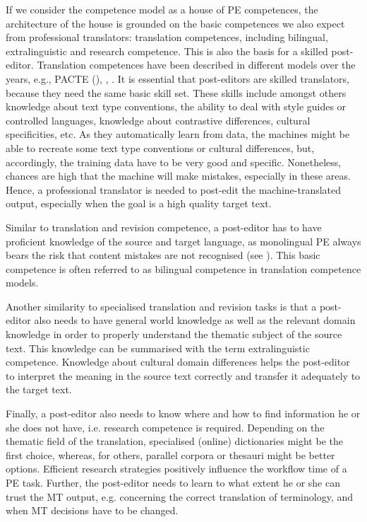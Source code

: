 If we consider the competence model as a house of PE competences, the architecture of the house is grounded on the basic competences we also expect from professional translators: translation competences, including bilingual, extralinguistic and research competence. This is also the basis for a skilled post-editor. Translation competences have been described in different models over the years, e.g., PACTE (\citeyear{beeby2003building}), \citet{emt2009competences}, \citet{gopferich2009towards}. It is essential that post-editors are skilled translators, because they need the same basic skill set. These skills include amongst others knowledge about text type conventions, the ability to deal with style guides or controlled languages, knowledge about contrastive differences, cultural specificities, etc. As they automatically learn from data, the machines might be able to recreate some text type conventions or cultural differences, but, accordingly, the training data have to be very good and specific. Nonetheless, chances are high that the machine will make mistakes, especially in these areas. Hence, a professional translator is needed to post-edit the machine-translated output, especially when the goal is a high quality target text.

Similar to translation and revision competence, a post-editor has to have proficient knowledge of the source and target language, as monolingual PE always bears the risk that content mistakes are not recognised (see ). This basic competence is often referred to as bilingual competence in translation competence models.

Another similarity to specialised translation and revision tasks is that a post-editor also needs to have general world knowledge as well as the relevant domain knowledge in order to properly understand the thematic subject of the source text. This knowledge can be summarised with the term extralinguistic competence. Knowledge about cultural domain differences helps the post-editor to interpret the meaning in the source text correctly and transfer it adequately to the target text.

Finally, a post-editor also needs to know where and how to find information he or she does not have, i.e. research competence is required. Depending on the thematic field of the translation, specialised (online) dictionaries might be the first choice, whereas, for others, parallel corpora or thesauri might be better options. Efficient research strategies positively influence the workflow time of a PE task. Further, the post-editor needs to learn to what extent he or she can trust the MT output, e.g. concerning the correct translation of terminology, and when MT decisions have to be changed.

